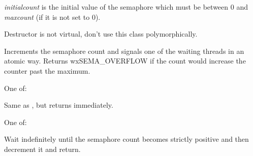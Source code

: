 {\it initialcount} is the initial value of the semaphore which must be between
$0$ and {\it maxcount} (if it is not set to $0$).

\label{wxsemaphoredtor}


Destructor is not virtual, don't use this class polymorphically.

\label{wxsemaphorepost}


Increments the semaphore count and signals one of the waiting
threads in an atomic way. Returns wxSEMA_OVERFLOW if the count
would increase the counter past the maximum.


One of:

\twocolwidtha{7cm}
\begin{twocollist}\itemsep=0pt
\end{twocollist}


\label{wxsemaphoretrywait}


Same as , but returns immediately.


One of:

\twocolwidtha{7cm}
\begin{twocollist}\itemsep=0pt
\end{twocollist}


\label{wxsemaphorewait}


Wait indefinitely until the semaphore count becomes strictly positive
and then decrement it and return.

